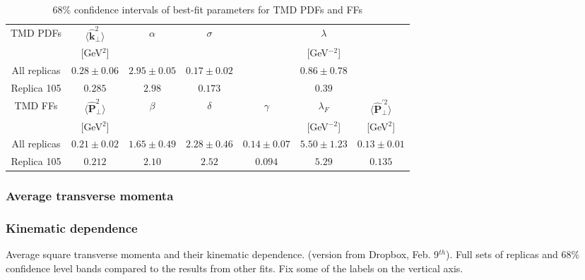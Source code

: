 \documentclass[aps,preprintnumbers,showpacs,nofootinbib,superscriptaddress,floatfix]{revtex4}
\newcommand{\T}{\perp}
\begin{document}
\begin{table}[h!]
\small
  \centering
  \begin{tabular}{|c||c|c|c|c|c|c|}
\hline
\hline
TMD PDFs&  $\big \langle \hat{\bm{k}}_{\T}^2 \big \rangle$ 
& $\alpha$ & $\sigma$ & & $\lambda$ &  
 \\ 
        & {[GeV$^2$]}                               &
       &      &  &{[GeV$^{-2}$]} & \\
\hline
All replicas &  $0.28\pm 0.06$ & $2.95\pm 0.05$ & $0.17\pm 0.02$ & 
                & $0.86\pm 0.78$ & 
\\
\hline
Replica 105  &  $0.285$ & $2.98$ & $0.173$ & & $0.39$ & \\
\hline
\hline
TMD FFs&  $\big \langle \hat{\bm{P}}_{\perp}^2 \big \rangle$ &
$\beta$ & $\delta$ & $\gamma$ & $\lambda_F$ & $\big \langle
\hat{\bm{P}}_{\perp}^{\prime 2} \big \rangle$
 \\ 
        & {[GeV$^2$]} &            &        & &{[GeV$^{-2}$]} &{[GeV$^2$]}    \\
\hline
All replicas & $0.21\pm 0.02$ & $1.65\pm 0.49$ & $2.28\pm 0.46$ & $0.14\pm 0.07$ &
$5.50\pm 1.23$ & $0.13\pm 0.01$ \\
\hline
Replica 105   &  
 $0.212$ & $2.10$ & $2.52$ & $0.094$ & $5.29$ & $0.135$ \\
\hline
\hline
\end{tabular}
\caption{68\% confidence intervals of 
best-fit parameters for TMD PDFs and FFs}
\label{t:fl_ind_par_TMD}
\end{table}



\subsubsection{Average transverse momenta}
\label{sss:kT2_PT2}


\subsubsection{Kinematic dependence}
\label{sss:kindep}

Average square transverse momenta and their kinematic dependence.  (version from Dropbox, Feb. 9$^{th}$).
Full sets of replicas and $68\%$ confidence level bands compared to the results from other fits.
Fix some of the labels on the vertical axis.
\end{document}
